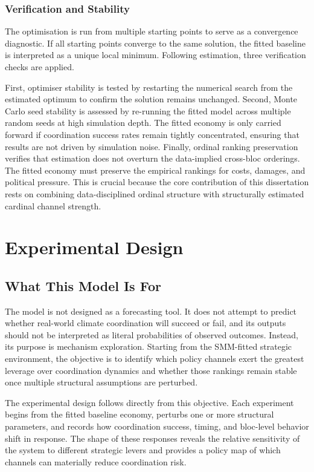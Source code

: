\documentclass[12pt,a4paper]{article}
\begin{document}
\subsubsection{Verification and Stability}

The optimisation is run from multiple starting points to serve as a convergence diagnostic. If all starting points converge to the same solution, the fitted baseline is interpreted as a unique local minimum. Following estimation, three verification checks are applied.

First, optimiser stability is tested by restarting the numerical search from the estimated optimum to confirm the solution remains unchanged. Second, Monte Carlo seed stability is assessed by re-running the fitted model across multiple random seeds at high simulation depth. The fitted economy is only carried forward if coordination success rates remain tightly concentrated, ensuring that results are not driven by simulation noise. Finally, ordinal ranking preservation verifies that estimation does not overturn the data-implied cross-bloc orderings. The fitted economy must preserve the empirical rankings for costs, damages, and political pressure. This is crucial because the core contribution of this dissertation rests on combining data-disciplined ordinal structure with structurally estimated cardinal channel strength.

\section{Experimental Design}

\subsection{What This Model Is For}

The model is not designed as a forecasting tool. It does not attempt to predict whether real-world climate coordination will succeed or fail, and its outputs should not be interpreted as literal probabilities of observed outcomes. Instead, its purpose is mechanism exploration. Starting from the SMM-fitted strategic environment, the objective is to identify which policy channels exert the greatest leverage over coordination dynamics and whether those rankings remain stable once multiple structural assumptions are perturbed.

The experimental design follows directly from this objective. Each experiment begins from the fitted baseline economy, perturbs one or more structural parameters, and records how coordination success, timing, and bloc-level behavior shift in response. The shape of these responses reveals the relative sensitivity of the system to different strategic levers and provides a policy map of which channels can materially reduce coordination risk.
\end{document}
